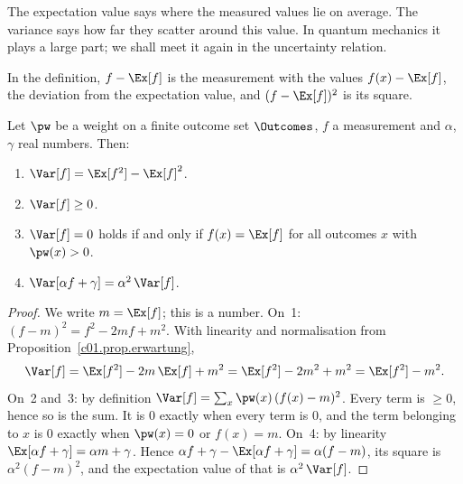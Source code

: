 The expectation value says where the measured values lie on average. The variance says
how far they scatter around this value. In quantum mechanics it plays a large part; we shall
meet it again in the uncertainty relation.


In the definition, $f - \Ex[f]$ is the measurement with the values $f(x) - \Ex[f]$, the
deviation from the expectation value, and $(f - \Ex[f])^2$ is its square.

\begin{proposition}\label{c01.prop.varianz}
  Let $\pw$ be a weight on a finite outcome set $\Outcomes$, $f$ a measurement
  and $\alpha$, $\gamma$ real numbers. Then:
  \begin{enumerate}
    \item $\Var[f] = \Ex[f^2] - \Ex[f]^2$.
    \item $\Var[f] \geq 0$.
    \item $\Var[f] = 0$ holds if and only if $f(x) = \Ex[f]$ for all outcomes $x$ with
      $\pw(x) > 0$.
    \item $\Var[\alpha f + \gamma] = \alpha^2\, \Var[f]$.
  \end{enumerate}
\end{proposition}
\begin{proof}
  We write $m = \Ex[f]$; this is a number. On~1:
  $(f - m)^2 = f^2 - 2 m f + m^2$. With linearity and normalisation from
  Proposition~\ref{c01.prop.erwartung},
  \begin{equation}\label{c01.eq.varianzformel}
    \Var[f] = \Ex[f^2] - 2m\, \Ex[f] + m^2 = \Ex[f^2] - 2m^2 + m^2 = \Ex[f^2] - m^2 .
  \end{equation}
  On~2 and~3: by definition $\Var[f] = \sum_x \pw(x)\,(f(x) - m)^2$. Every term
  is $\geq 0$, hence so is the sum. It is $0$ exactly when every term is $0$,
  and the term belonging to $x$ is $0$ exactly when $\pw(x) = 0$ or $f(x) = m$.
  On~4: by linearity $\Ex[\alpha f + \gamma] = \alpha m + \gamma$. Hence
  $\alpha f + \gamma - \Ex[\alpha f + \gamma] = \alpha (f - m)$, its square is
  $\alpha^2 (f - m)^2$, and the expectation value of that is $\alpha^2\, \Var[f]$.
\end{proof}

